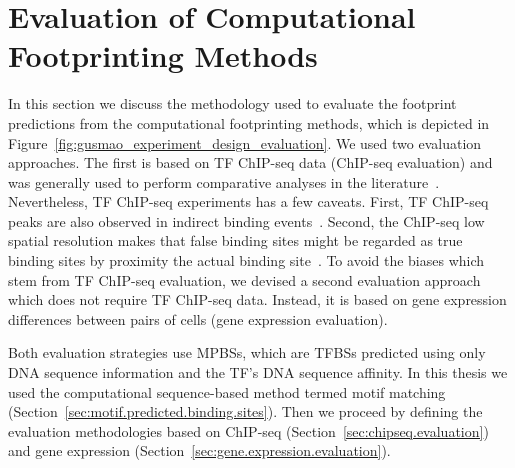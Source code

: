 \section{Evaluation of Computational Footprinting Methods}
\label{sec:evaluation.computational.footprinting.methods}

In this section we discuss the methodology used to evaluate the footprint predictions from the computational footprinting methods, which is depicted in Figure~\ref{fig:gusmao_experiment_design_evaluation}. We used two evaluation approaches. The first is based on TF ChIP-seq data (ChIP-seq evaluation) and was generally used to perform comparative analyses in the literature~\citep{pique2011,boyle2011,cuellar2012}. Nevertheless, TF ChIP-seq experiments has a few caveats. First, TF ChIP-seq peaks are also observed in indirect binding events~\citep{yardimci2014}. Second, the ChIP-seq low spatial resolution makes that false binding sites might be regarded as true binding sites by proximity the actual binding site~\citep{cuellar2012,yardimci2014}. To avoid the biases which stem from TF ChIP-seq evaluation, we devised a second evaluation approach which does not require TF ChIP-seq data. Instead, it is based on gene expression differences between pairs of cells (gene expression evaluation).

Both evaluation strategies use MPBSs, which are TFBSs predicted using only DNA sequence information and the TF's DNA sequence affinity. In this thesis we used the computational sequence-based method termed motif matching (Section~\ref{sec:motif.predicted.binding.sites}). Then we proceed by defining the evaluation methodologies based on ChIP-seq (Section~\ref{sec:chipseq.evaluation}) and gene expression (Section~\ref{sec:gene.expression.evaluation}).

